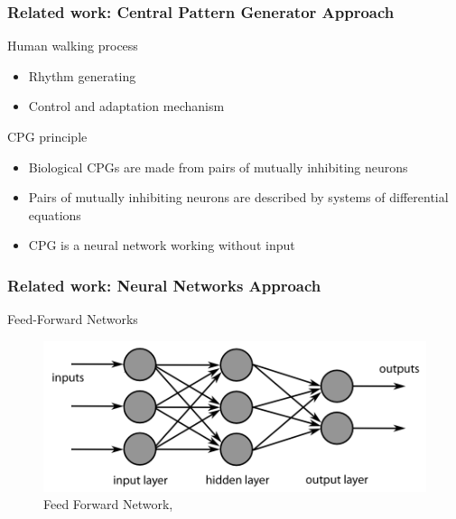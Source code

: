 \documentclass{beamer}
\begin{document}

	\begin{frame}
		\frametitle{Related work: Central Pattern Generator Approach}
		\begin{block}{Human walking process}
			\begin{itemize}
				\item
					Rhythm generating
				\item
					Control and adaptation mechanism
					
			\end{itemize}
		\end{block}
		\begin{block}{CPG principle}
			\begin{itemize}
				\item
					Biological CPGs are made from pairs of mutually inhibiting neurons
				\item
					Pairs of mutually inhibiting neurons are described by systems of differential equations
				\item
					CPG is a neural network working without input
			\end{itemize}
		\end{block}
	\end{frame}


	\begin{frame}
		\frametitle{Related work: Neural Networks Approach}
		\centering
		Feed-Forward Networks
		
		\begin{figure}[h!]
			\begin{minipage}[H]{\linewidth}
				\centering
				\includegraphics[width=\linewidth]{presentation_images/9}
				\caption{Feed Forward Network, \cite{kim2012zmp}}
			\end{minipage}
		\end{figure}
	\end{frame}
\end{document}
